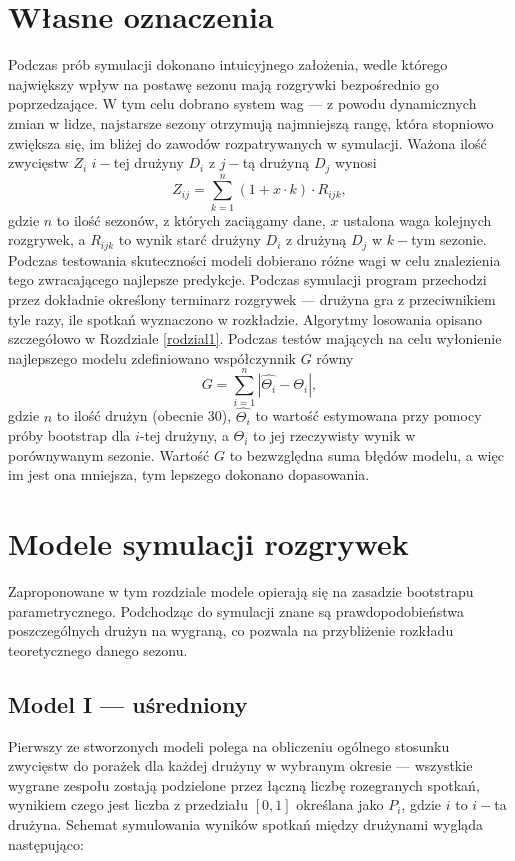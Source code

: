 \documentclass[inzynierska]{pwr_wmat_praca_dyplomowa}
\theoremstyle{plain}
\numberwithin{theorem}{chapter}
\theoremstyle{definition}
\numberwithin{theorem}{chapter}
\begin{document}
\section{Własne oznaczenia} \label{wlasne_oznaczenia}
Podczas prób symulacji dokonano intuicyjnego założenia, wedle którego największy wpływ na postawę sezonu mają rozgrywki bezpośrednio go poprzedzające. W tym celu dobrano system wag --- z powodu dynamicznych zmian w lidze, najstarsze sezony otrzymują najmniejszą rangę, która stopniowo zwiększa się, im bliżej do zawodów rozpatrywanych w symulacji. Ważona ilość zwycięstw $Z_i$ $i-$tej drużyny $D_i$ z $j-$tą drużyną $D_j$ wynosi
\begin{equation}
	Z_{ij} = \sum_{k=1}^{n} (1+x\cdot k)\cdot R_{ijk}, 
\end{equation}
gdzie $n$ to ilość sezonów, z których zaciągamy dane, $x$ ustalona waga kolejnych rozgrywek, a $R_{ijk}$ to wynik starć drużyny $D_i$ z drużyną $D_j$ w $k-$tym sezonie. Podczas testowania skuteczności modeli dobierano różne wagi w celu znalezienia tego zwracającego najlepsze predykcje. Podczas symulacji program przechodzi przez dokładnie określony terminarz rozgrywek --- drużyna gra z przeciwnikiem tyle razy, ile spotkań wyznaczono w rozkładzie. Algorytmy losowania opisano szczegółowo w Rozdziale \ref{rodzial1}. 
Podczas testów mających na celu wyłonienie najlepszego modelu zdefiniowano współczynnik $G$ równy
\begin{equation}\label{wskaznik_g}
	G = \sum_{i=1}^{n}|\hat{\Theta_i} - \Theta_i|,
\end{equation}
gdzie $n$ to ilość drużyn (obecnie 30), $\hat{\Theta_i}$ to wartość estymowana przy pomocy próby bootstrap dla $i$-tej drużyny, a $\Theta_i$ to jej rzeczywisty wynik w porównywanym sezonie. Wartość $G$ to bezwzględna suma błędów modelu, a więc im jest ona mniejsza, tym lepszego dokonano dopasowania. 

\section{Modele symulacji rozgrywek}
Zaproponowane w tym rozdziale modele opierają się na zasadzie bootstrapu parametrycznego. Podchodząc do symulacji znane są prawdopodobieństwa poszczególnych drużyn na wygraną, co pozwala na przybliżenie rozkładu teoretycznego danego sezonu. 

\subsection{Model I --- uśredniony}
Pierwszy ze stworzonych modeli polega na obliczeniu ogólnego stosunku zwycięstw do porażek dla każdej drużyny w wybranym okresie --- wszystkie wygrane zespołu zostają podzielone przez łączną liczbę rozegranych spotkań, wynikiem czego jest liczba z przedziału $[0,1]$ określana jako $P_{i}$, gdzie $i$ to $i-$ta drużyna. Schemat symulowania wyników spotkań między drużynami wygląda następująco:
\end{document}
